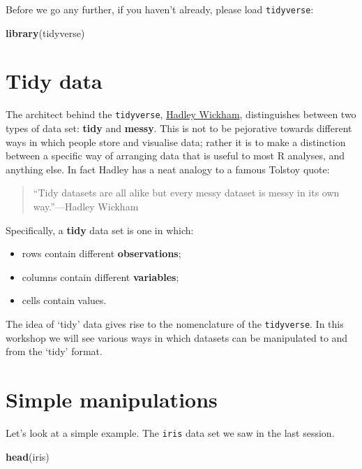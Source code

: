 \documentclass[]{book}
\newenvironment{Shaded}{\begin{snugshade}}{\end{snugshade}}
\newcommand{\KeywordTok}[1]{\textcolor[rgb]{0.13,0.29,0.53}{\textbf{{#1}}}}
\newcommand{\NormalTok}[1]{{#1}}
\providecommand{\tightlist}{%
  \setlength{\itemsep}{0pt}\setlength{\parskip}{0pt}}
\theoremstyle{definition}
\theoremstyle{definition}
\theoremstyle{definition}
\theoremstyle{remark}
\begin{document}
Before we go any further, if you haven't already, please load
\texttt{tidyverse}:

\begin{Shaded}
\begin{Highlighting}[]
\KeywordTok{library}\NormalTok{(tidyverse)}
\end{Highlighting}
\end{Shaded}

\section{Tidy data}\label{tidy-data}

The architect behind the \texttt{tidyverse},
\href{http://hadley.nz/}{Hadley Wickham}, distinguishes between two
types of data set: \textbf{tidy} and \textbf{messy}. This is not to be
pejorative towards different ways in which people store and visualise
data; rather it is to make a distinction between a specific way of
arranging data that is useful to most R analyses, and anything else. In
fact Hadley has a neat analogy to a famous Tolstoy quote:

\begin{quote}
``Tidy datasets are all alike but every messy dataset is messy in its
own way.''---Hadley Wickham
\end{quote}

Specifically, a \textbf{tidy} data set is one in which:

\begin{itemize}
\tightlist
\item
  rows contain different \textbf{observations};
\item
  columns contain different \textbf{variables};
\item
  cells contain values.
\end{itemize}

The idea of `tidy' data gives rise to the nomenclature of the
\texttt{tidyverse}. In this workshop we will see various ways in which
datasets can be manipulated to and from the `tidy' format.

\section{Simple manipulations}\label{simple-manipulations}

Let's look at a simple example. The \texttt{iris} data set we saw in the
last session.

\begin{Shaded}
\begin{Highlighting}[]
\KeywordTok{head}\NormalTok{(iris)}
\end{Highlighting}
\end{Shaded}
\end{document}

